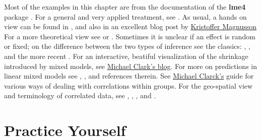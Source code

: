 \documentclass[]{book}
\theoremstyle{definition}
\theoremstyle{definition}
\theoremstyle{definition}
\theoremstyle{remark}
\begin{document}
Most of the examples in this chapter are from the documentation of the
\textbf{lme4} package \citep{lme4}. For a general and very applied
treatment, see \citet{pinero2000mixed}. As usual, a hands on view can be
found in \citet{venables2013modern}, and also in an excellent blog post
by
\href{http://rpsychologist.com/r-guide-longitudinal-lme-lmer}{Kristoffer
Magnusson} For a more theoretical view see \citet{weiss2005modeling} or
\citet{searle2009variance}. Sometimes it is unclear if an effect is
random or fixed; on the difference between the two types of inference
see the classics: \citet{eisenhart1947assumptions},
\citet{kempthorne1975fixed}, and the more recent
\citet{rosset2018fixed}. For an interactive, beatiful visualization of
the shrinkage introduced by mixed models, see
\href{http://m-clark.github.io/posts/2019-05-14-shrinkage-in-mixed-models/}{Michael
Clark's blog}. For more on predictions in linear mixed models see
\citet{robinson1991blup}, \citet{rabinowicz2018assessing}, and
references therein. See
\href{https://m-clark.github.io/docs/clustered/}{Michael Clarck's} guide
for various ways of dealing with correlations within groups. For the
geo-spatial view and terminology of correlated data, see
\citet{christakos2000modern}, \citet{diggle1998model},
\citet{allard2013j}, and \citet{cressie2015statistics}.

\section{Practice Yourself}\label{practice-yourself-4}
\end{document}
